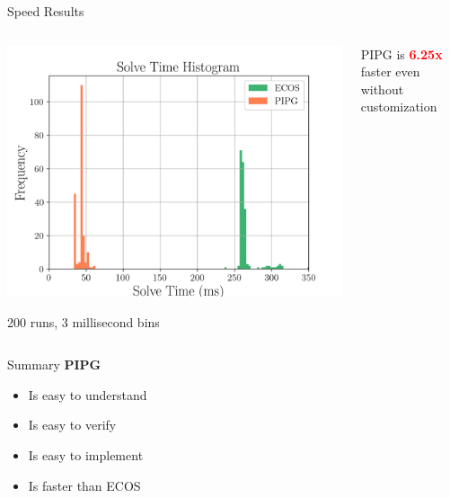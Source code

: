 \documentclass[aspectratio=169]{beamer}
\begin{document}
\begin{frame}{Speed Results}


    \begin{columns}[T]
        \begin{column}{.6\textwidth}
            \includegraphics[width=\linewidth]{img/solve_speed.png}\begin{center}
                {200 runs, 3 millisecond bins}
            \end{center}
        \end{column}
        \begin{column}{.4\textwidth}
            \begin{center}

                \vspace{0.5cm}

            \end{center} 
            
            PIPG is \textbf{\textcolor{red}{6.25x}} faster even without customization

        \end{column}
    \end{columns}
\end{frame}
\begin{frame}{Summary}
    \textbf{PIPG}
    \begin{itemize}
        \item Is easy to understand
        \item Is easy to verify
        \item Is easy to implement
        \item Is faster than ECOS
    \end{itemize}
    
\end{frame}
\end{document}
